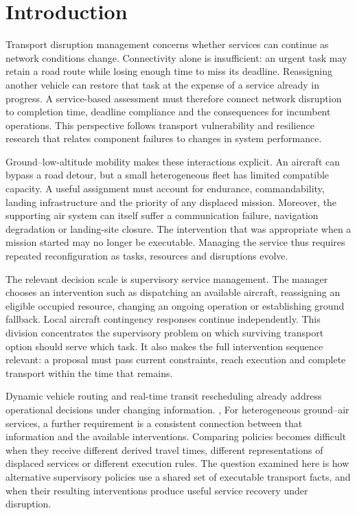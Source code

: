 \documentclass[]{interact}
\theoremstyle{plain}
\theoremstyle{definition}
\theoremstyle{remark}
\begin{document}
\section{Introduction}

Transport disruption management concerns whether services can continue as network conditions change. Connectivity alone is insufficient: an urgent task may retain a road route while losing enough time to miss its deadline. Reassigning another vehicle can restore that task at the expense of a service already in progress. A service-based assessment must therefore connect network disruption to completion time, deadline compliance and the consequences for incumbent operations. This perspective follows transport vulnerability and resilience research that relates component failures to changes in system performance. \citep{ref1}

Ground--low-altitude mobility makes these interactions explicit. An aircraft can bypass a road detour, but a small heterogeneous fleet has limited compatible capacity. A useful assignment must account for endurance, commandability, landing infrastructure and the priority of any displaced mission. Moreover, the supporting air system can itself suffer a communication failure, navigation degradation or landing-site closure. The intervention that was appropriate when a mission started may no longer be executable. Managing the service thus requires repeated reconfiguration as tasks, resources and disruptions evolve.

The relevant decision scale is supervisory service management. The manager chooses an intervention such as dispatching an available aircraft, reassigning an eligible occupied resource, changing an ongoing operation or establishing ground fallback. Local aircraft contingency responses continue independently. This division concentrates the supervisory problem on which surviving transport option should serve which task. It also makes the full intervention sequence relevant: a proposal must pass current constraints, reach execution and complete transport within the time that remains.

Dynamic vehicle routing and real-time transit rescheduling already address operational decisions under changing information. \citep{ref4}, \citep{ref5} For heterogeneous ground--air services, a further requirement is a consistent connection between that information and the available interventions. Comparing policies becomes difficult when they receive different derived travel times, different representations of displaced services or different execution rules. The question examined here is how alternative supervisory policies use a shared set of executable transport facts, and when their resulting interventions produce useful service recovery under disruption.
\end{document}
